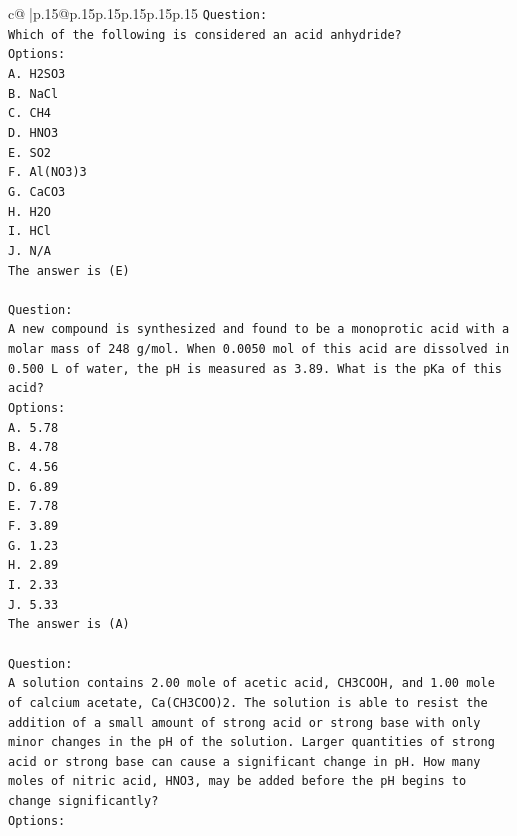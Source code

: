 \documentclass{article}
\begin{document}
{\begin{supertabular}{c@{$\;$}|p{.15\linewidth}@{}p{.15\linewidth}p{.15\linewidth}p{.15\linewidth}p{.15\linewidth}p{.15\linewidth}}
{{{\texttt{Question:} \\
\texttt{Which of the following is considered an acid anhydride?} \\
\texttt{Options:} \\
\texttt{A. H2SO3} \\
\texttt{B. NaCl} \\
\texttt{C. CH4} \\
\texttt{D. HNO3} \\
\texttt{E. SO2} \\
\texttt{F. Al(NO3)3} \\
\texttt{G. CaCO3} \\
\texttt{H. H2O} \\
\texttt{I. HCl} \\
\texttt{J. N/A} \\
\texttt{The answer is (E)} \\
\\ 
\texttt{Question:} \\
\texttt{A new compound is synthesized and found to be a monoprotic acid with a molar mass of 248 g/mol. When 0.0050 mol of this acid are dissolved in 0.500 L of water, the pH is measured as 3.89. What is the pKa of this acid?} \\
\texttt{Options:} \\
\texttt{A. 5.78} \\
\texttt{B. 4.78} \\
\texttt{C. 4.56} \\
\texttt{D. 6.89} \\
\texttt{E. 7.78} \\
\texttt{F. 3.89} \\
\texttt{G. 1.23} \\
\texttt{H. 2.89} \\
\texttt{I. 2.33} \\
\texttt{J. 5.33} \\
\texttt{The answer is (A)} \\
\\ 
\texttt{Question:} \\
\texttt{A solution contains 2.00 mole of acetic acid, CH3COOH, and 1.00 mole of calcium acetate, Ca(CH3COO)2. The solution is able to resist the addition of a small amount of strong acid or strong base with only minor changes in the pH of the solution. Larger quantities of strong acid or strong base can cause a significant change in pH. How many moles of nitric acid, HNO3, may be added before the pH begins to change significantly?} \\
\texttt{Options:} \\
}}}
\end{supertabular}}
\end{document}
